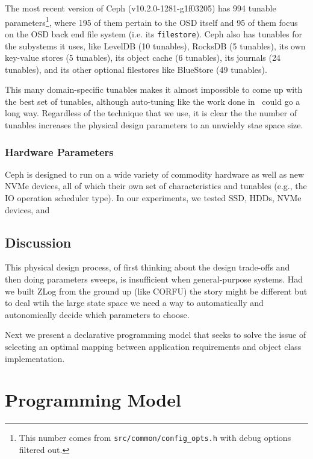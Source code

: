 \documentclass[10pt,twocolumn]{article}
\begin{document}
The most recent version of Ceph (v10.2.0-1281-g1f03205) has 994 tunable
parameters\footnote{This number comes from \texttt{src/common/config\_opts.h}
with debug options filtered out.}, where 195 of them pertain to the OSD itself
and 95 of them focus on the OSD back end file system (i.e. its
\texttt{filestore}). Ceph also has tunables for the subystems it uses, like
LevelDB (10 tunables), RocksDB (5 tunables), its own key-value stores (5
tunables), its object cache (6 tunables), its journals (24 tunables), and its
other optional filestores like BlueStore (49 tunables).

This many domain-specific tunables makes it almost impossible to come up with
the best set of tunables, although auto-tuning like the work done
in~\cite{behzad:sc2013-autotuning} could go a long way. Regardless of the
technique that we use, it is clear the the number of tunables increases the
physical design parameters to an unwieldy stae space size.

\subsubsection{Hardware Parameters}

Ceph is designed to run on a wide variety of commodity hardware as well as new
NVMe devices, all of which their own set of characteristics and tunables (e.g.,
the IO operation scheduler type). In our experiments, we tested SSD, HDDs, NVMe
devices, and 

\subsection{Discussion}

This physical design process, of first thinking about the design trade-offs and
then doing parameters sweeps, is insufficient when general-purpose systems. Had
we built ZLog from the ground up (like CORFU) the story might be different but
to deal wtih the large state space we need a way to automatically and
autonomically decide which parameters to choose. 

Next we present a declarative programming model that seeks to solve the issue
of selecting an optimal mapping between application requirements and object
class implementation.

\section{Programming Model}
\end{document}
